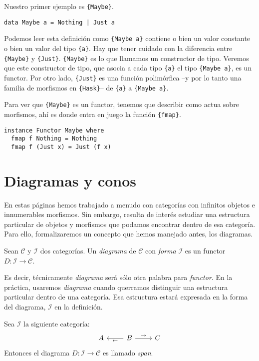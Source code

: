 \documentclass[12pt, twoside]{book}
\newcommand{\code}[1]{\Verb+{#1}+}
\newcommand{\cat}{{\mathcal{C}}}
\begin{document}
\begin{example}
Nuestro primer ejemplo es \code{Maybe}.
\begin{verbatim}
data Maybe a = Nothing | Just a 
\end{verbatim}

Podemos leer esta definición como \code{Maybe a} contiene o bien un valor constante o bien un valor del tipo \code{a}.
Hay que tener cuidado con la diferencia entre \code{Maybe} y \code{Just}.
\code{Maybe} es lo que llamamos un constructor de tipo.
Veremos que este constructor de tipo, que asocia a cada tipo \code{a} el tipo \code{Maybe a}, es un functor.
Por otro lado, \code{Just} es una función polimórfica --y por lo tanto una familia de morfismos en \code{Hask}-- de \code{a} a \code{Maybe a}.

Para ver que \code{Maybe} es un functor, tenemos que describir como actua sobre morfismos, ahí es donde entra en juego la función \code{fmap}.

\begin{verbatim}
instance Functor Maybe where
  fmap f Nothing = Nothing
  fmap f (Just x) = Just (f x) 
\end{verbatim}
\end{example}

\section{Diagramas y conos}
En estas páginas hemos trabajado a menudo con categorías con infinitos objetos e innumerables morfismos.
Sin embargo, resulta de interés estudiar una estructura particular de objetos y morfismos que podamos encontrar dentro de esa categoría.
Para ello, formalizaremos un concepto que hemos manejado antes, los diagramas.
\begin{definition}
Sean $\cat$ y $\mathcal{I}$ dos categorías. Un \emph{diagrama} de $\cat$ con \emph{forma} $\mathcal{I}$ es un functor $D \colon \mathcal{I} \to \cat$.
\end{definition}
Es decir, técnicamente \emph{diagrama} será sólo otra palabra para \emph{functor}.
En la práctica, usaremos \emph{diagrama} cuando querramos distinguir una estructura particular dentro de una categoría.
Esa estructura estará expresada en la forma del diagrama, $\mathcal{I}$ en la definición.

\begin{example}
Sea $\mathcal{I}$ la siguiente categoría:
\[ \begin{tikzcd}
A & B \arrow[l,"\leftarrow"] \arrow[r,"\rightarrow"] & C
\end{tikzcd} \]
Entonces el diagrama $D \colon \mathcal{I} \to \cat$ es llamado \emph{span}.
\end{example}
\end{document}
